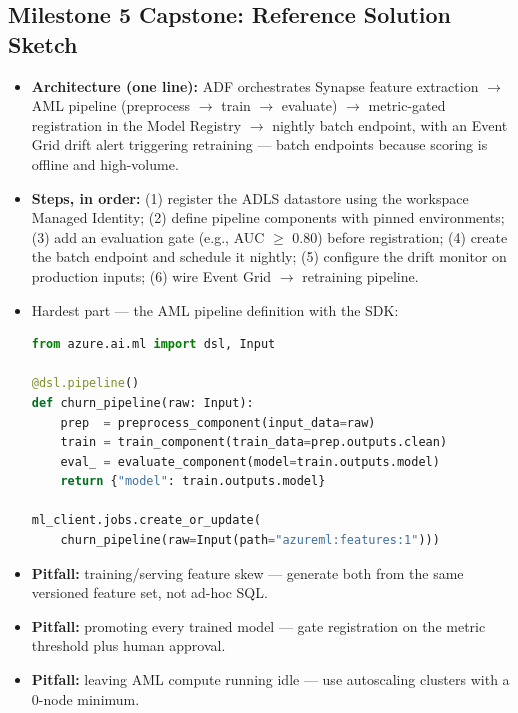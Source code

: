\documentclass[11pt, a4paper]{article}
\begin{document}
\subsection*{Milestone 5 Capstone: Reference Solution Sketch}
\begin{itemize}[label=-, itemsep=1pt]
    \item \textbf{Architecture (one line):} ADF orchestrates Synapse feature extraction $\rightarrow$ AML pipeline (preprocess $\rightarrow$ train $\rightarrow$ evaluate) $\rightarrow$ metric-gated registration in the Model Registry $\rightarrow$ nightly batch endpoint, with an Event Grid drift alert triggering retraining --- batch endpoints because scoring is offline and high-volume.
    \item \textbf{Steps, in order:} (1) register the ADLS datastore using the workspace Managed Identity; (2) define pipeline components with pinned environments; (3) add an evaluation gate (e.g., AUC $\geq$ 0.80) before registration; (4) create the batch endpoint and schedule it nightly; (5) configure the drift monitor on production inputs; (6) wire Event Grid $\rightarrow$ retraining pipeline.
    \item Hardest part --- the AML pipeline definition with the SDK:
\begin{lstlisting}[language=Python]
from azure.ai.ml import dsl, Input

@dsl.pipeline()
def churn_pipeline(raw: Input):
    prep  = preprocess_component(input_data=raw)
    train = train_component(train_data=prep.outputs.clean)
    eval_ = evaluate_component(model=train.outputs.model)
    return {"model": train.outputs.model}

ml_client.jobs.create_or_update(
    churn_pipeline(raw=Input(path="azureml:features:1")))
\end{lstlisting}
    \item \textbf{Pitfall:} training/serving feature skew --- generate both from the same versioned feature set, not ad-hoc SQL.
    \item \textbf{Pitfall:} promoting every trained model --- gate registration on the metric threshold plus human approval.
    \item \textbf{Pitfall:} leaving AML compute running idle --- use autoscaling clusters with a 0-node minimum.
\end{itemize}
\end{document}
